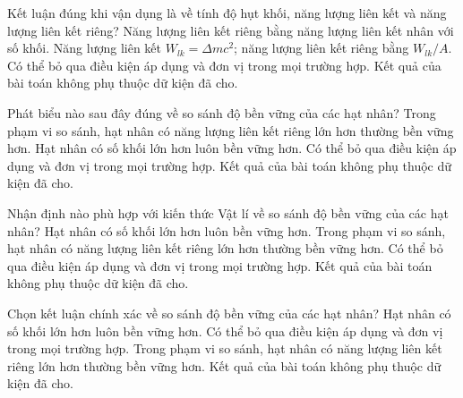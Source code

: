 \begin{ex}
Kết luận đúng khi vận dụng là về tính độ hụt khối, năng lượng liên kết và năng lượng liên kết riêng?
\choice
{Năng lượng liên kết riêng bằng năng lượng liên kết nhân với số khối.}
{\True Năng lượng liên kết $W_{lk}=\Delta m c^2$; năng lượng liên kết riêng bằng $W_{lk}/A$.}
{Có thể bỏ qua điều kiện áp dụng và đơn vị trong mọi trường hợp.}
{Kết quả của bài toán không phụ thuộc dữ kiện đã cho.}
\end{ex}

\begin{ex}
Phát biểu nào sau đây đúng về so sánh độ bền vững của các hạt nhân?
\choice
{\True Trong phạm vi so sánh, hạt nhân có năng lượng liên kết riêng lớn hơn thường bền vững hơn.}
{Hạt nhân có số khối lớn hơn luôn bền vững hơn.}
{Có thể bỏ qua điều kiện áp dụng và đơn vị trong mọi trường hợp.}
{Kết quả của bài toán không phụ thuộc dữ kiện đã cho.}
\end{ex}

\begin{ex}
Nhận định nào phù hợp với kiến thức Vật lí về so sánh độ bền vững của các hạt nhân?
\choice
{Hạt nhân có số khối lớn hơn luôn bền vững hơn.}
{\True Trong phạm vi so sánh, hạt nhân có năng lượng liên kết riêng lớn hơn thường bền vững hơn.}
{Có thể bỏ qua điều kiện áp dụng và đơn vị trong mọi trường hợp.}
{Kết quả của bài toán không phụ thuộc dữ kiện đã cho.}
\end{ex}

\begin{ex}
Chọn kết luận chính xác về so sánh độ bền vững của các hạt nhân?
\choice
{Hạt nhân có số khối lớn hơn luôn bền vững hơn.}
{Có thể bỏ qua điều kiện áp dụng và đơn vị trong mọi trường hợp.}
{\True Trong phạm vi so sánh, hạt nhân có năng lượng liên kết riêng lớn hơn thường bền vững hơn.}
{Kết quả của bài toán không phụ thuộc dữ kiện đã cho.}
\end{ex}

